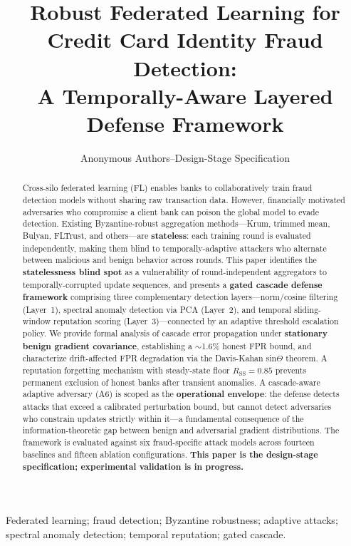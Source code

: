 \documentclass[10pt,journal]{IEEEtran}
\title{Robust Federated Learning for Credit Card Identity Fraud Detection:\\
A Temporally-Aware Layered Defense Framework}
\author{Anonymous Authors--Design-Stage Specification}
\begin{document}
\maketitle

\begin{abstract}
Cross-silo federated learning (FL) enables banks to collaboratively train fraud detection models without sharing raw transaction data. However, financially motivated adversaries who compromise a client bank can poison the global model to evade detection. Existing Byzantine-robust aggregation methods---Krum, trimmed mean, Bulyan, FLTrust, and others---are \textbf{stateless}: each training round is evaluated independently, making them blind to temporally-adaptive attackers who alternate between malicious and benign behavior across rounds. This paper identifies the \textbf{statelessness blind spot} as a vulnerability of round-independent aggregators to temporally-corrupted update sequences, and presents a \textbf{gated cascade defense framework} comprising three complementary detection layers---norm/cosine filtering (Layer~1), spectral anomaly detection via PCA (Layer~2), and temporal sliding-window reputation scoring (Layer~3)---connected by an adaptive threshold escalation policy. We provide formal analysis of cascade error propagation under \textbf{stationary benign gradient covariance}, establishing a $\sim$1.6\% honest FPR bound, and characterize drift-affected FPR degradation via the Davis-Kahan sin$\Theta$ theorem. A reputation forgetting mechanism with steady-state floor $R_{\text{SS}} = 0.85$ prevents permanent exclusion of honest banks after transient anomalies. A cascade-aware adaptive adversary (A6) is scoped as the \textbf{operational envelope}: the defense detects attacks that exceed a calibrated perturbation bound, but cannot detect adversaries who constrain updates strictly within it---a fundamental consequence of the information-theoretic gap between benign and adversarial gradient distributions. The framework is evaluated against six fraud-specific attack models across fourteen baselines and fifteen ablation configurations. \textbf{This paper is the design-stage specification; experimental validation is in progress.}
\end{abstract}

\begin{IEEEkeywords}
Federated learning; fraud detection; Byzantine robustness; adaptive attacks; spectral anomaly detection; temporal reputation; gated cascade.
\end{IEEEkeywords}
\end{document}

